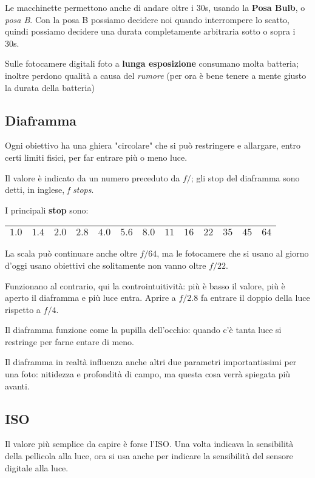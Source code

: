 Le macchinette permettono anche di andare oltre i 30s, usando la \textbf{Posa Bulb}, o \textit{posa B}.
Con la posa B possiamo decidere noi quando interrompere lo scatto, quindi possiamo decidere una durata completamente arbitraria sotto o sopra i 30s.

\nb Sulle fotocamere digitali foto a \textbf{lunga esposizione} consumano molta batteria; inoltre perdono qualità a causa del \textit{rumore} (per ora è bene tenere a mente giusto la durata della batteria)


\subsection{Diaframma} \label{subsec:diaframma}
Ogni obiettivo ha una ghiera "circolare" che si può restringere e allargare, entro certi
limiti fisici, per far entrare più o meno luce.

Il valore è indicato da un numero preceduto da $f/$; gli stop del diaframma sono detti, in inglese, \textit{f stops}.

I principali \textbf{stop} sono:
\begin{table}[h]
    \centering
    \begin{tabular}{|l|l|l|l|l|l|l|l|l|l|l|l|l|}
        \hline
        $1.0$ & $1.4$ & $2.0$ & $2.8$ & $4.0$ & $5.6$ & $8.0$ & $11$ & $16$ & $22$ & $35$ & $45$ & $64$\\
        \hline
    \end{tabular}
\end{table}

\nb La scala può continuare anche oltre $f/64$, ma le fotocamere che si usano al giorno d'oggi usano obiettivi che solitamente non vanno oltre $f/22$.

Funzionano al contrario, qui la controintuitività: più è basso il valore, più è aperto il
diaframma e più luce entra.\newline
Aprire a $f/2.8$ fa entrare il doppio della luce rispetto a $f/4$.

Il diaframma funzione come la pupilla dell'occhio: quando c'è tanta luce si restringe per farne entare di meno.

Il diaframma in realtà influenza anche altri due parametri importantissimi per una foto:
nitidezza e profondità di campo, ma questa cosa verrà spiegata più avanti.


\subsection{ISO}  \label{subsec:ISO}
Il valore più semplice da capire è forse l'ISO.
Una volta indicava la sensibilità della pellicola alla luce, ora si usa anche per indicare la sensibilità del sensore digitale alla luce.

